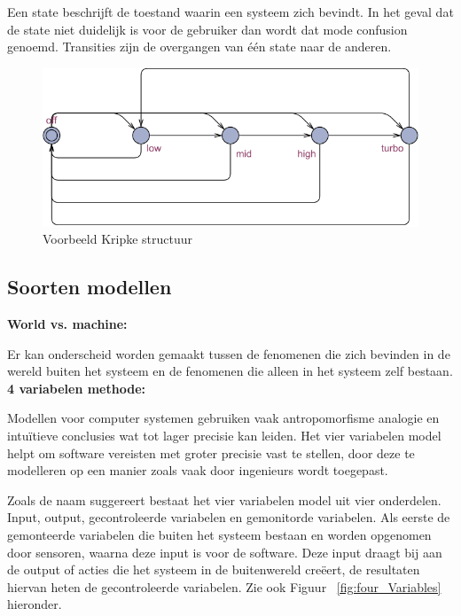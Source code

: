 \documentclass{article}
\begin{document}
Een state beschrijft de toestand waarin een systeem zich bevindt. In het geval dat de state niet duidelijk is voor de gebruiker dan wordt dat mode confusion genoemd. Transities zijn de overgangen van één state naar de anderen. 

\begin{figure}[!h]
	\centering
	\includegraphics[width=\textwidth]{kripke_structure_example1}
    \caption{Voorbeeld Kripke structuur}
\end{figure}

\subsection{Soorten modellen} \label{SoortenModellen}

\textbf{World vs. machine:} 

Er kan onderscheid worden gemaakt tussen de fenomenen die zich bevinden in de wereld buiten het systeem en de fenomenen die alleen in het systeem zelf bestaan. \newline
\textbf{4 variabelen methode:}

Modellen voor computer systemen gebruiken vaak antropomorfisme analogie en intuïtieve conclusies wat tot lager precisie kan leiden. Het vier variabelen model helpt om software vereisten met groter precisie vast te stellen, door deze te modelleren op een manier zoals vaak door ingenieurs wordt toegepast. \cite{parnas1995functional} 

Zoals de naam suggereert bestaat het vier variabelen model uit vier onderdelen. Input, output, gecontroleerde variabelen en gemonitorde variabelen. Als eerste de gemonteerde variabelen die buiten het systeem bestaan en worden opgenomen door sensoren, waarna deze input is voor de software. Deze input draagt bij aan de output of acties die het systeem in de buitenwereld creëert, de resultaten hiervan heten de gecontroleerde variabelen. Zie ook Figuur ~\ref{fig:four_Variables} hieronder.
\end{document}
